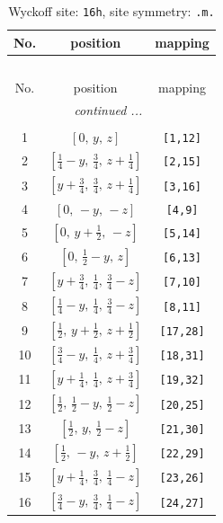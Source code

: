 \documentclass[fleqn,8pt]{jsarticle}
\begin{document}
\renewcommand{\arraystretch}{1.2}
\begin{longtable}{ccc}
\caption{Wyckoff site: {\tt 16h}, site symmetry: {\tt .m.}}
 \\
 \hline \hline
No. & position & mapping \\ \hline \endfirsthead

\multicolumn{2}{l}{\tablename\ \thetable{}} \\
 \hline \hline
No. & position & mapping \\ \hline \endhead

 \hline \hline
\multicolumn{2}{r}{\footnotesize\it continued ...} \\ \endfoot

 \hline \hline
\multicolumn{2}{r}{} \\ \endlastfoot

1 & $\left[ 0,\, y,\, z \right]$ & {\tt [1,12]} \\ \hline
2 & $\left[ \frac{1}{4} - y,\, \frac{3}{4},\, z + \frac{1}{4} \right]$ & {\tt [2,15]} \\ \hline
3 & $\left[ y + \frac{3}{4},\, \frac{3}{4},\, z + \frac{1}{4} \right]$ & {\tt [3,16]} \\ \hline
4 & $\left[ 0,\, - y,\, - z \right]$ & {\tt [4,9]} \\ \hline
5 & $\left[ 0,\, y + \frac{1}{2},\, - z \right]$ & {\tt [5,14]} \\ \hline
6 & $\left[ 0,\, \frac{1}{2} - y,\, z \right]$ & {\tt [6,13]} \\ \hline
7 & $\left[ y + \frac{3}{4},\, \frac{1}{4},\, \frac{3}{4} - z \right]$ & {\tt [7,10]} \\ \hline
8 & $\left[ \frac{1}{4} - y,\, \frac{1}{4},\, \frac{3}{4} - z \right]$ & {\tt [8,11]} \\ \hline
9 & $\left[ \frac{1}{2},\, y + \frac{1}{2},\, z + \frac{1}{2} \right]$ & {\tt [17,28]} \\ \hline
10 & $\left[ \frac{3}{4} - y,\, \frac{1}{4},\, z + \frac{3}{4} \right]$ & {\tt [18,31]} \\ \hline
11 & $\left[ y + \frac{1}{4},\, \frac{1}{4},\, z + \frac{3}{4} \right]$ & {\tt [19,32]} \\ \hline
12 & $\left[ \frac{1}{2},\, \frac{1}{2} - y,\, \frac{1}{2} - z \right]$ & {\tt [20,25]} \\ \hline
13 & $\left[ \frac{1}{2},\, y,\, \frac{1}{2} - z \right]$ & {\tt [21,30]} \\ \hline
14 & $\left[ \frac{1}{2},\, - y,\, z + \frac{1}{2} \right]$ & {\tt [22,29]} \\ \hline
15 & $\left[ y + \frac{1}{4},\, \frac{3}{4},\, \frac{1}{4} - z \right]$ & {\tt [23,26]} \\ \hline
16 & $\left[ \frac{3}{4} - y,\, \frac{3}{4},\, \frac{1}{4} - z \right]$ & {\tt [24,27]} \\
\end{longtable}
\end{document}
